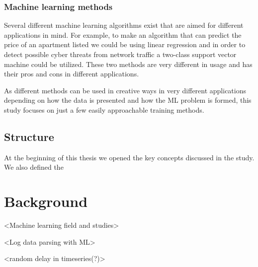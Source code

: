 \documentclass[english, 12pt, a4paper, elec, utf8, a-1b, online]{aaltothesis}
\begin{document}
\subsubsection*{Machine learning methods}
Several different machine learning algorithms exist
that are aimed for different applications in mind.
For example,
to make an algorithm that can predict
the price of an apartment listed\cite{Winky}
we could be using linear regression
and in order to detect
possible cyber threats from network traffic\cite{Ghanem}
a two-class support vector machine could be utilized.
These two methods are very different in usage
and has their pros and cons in different applications.

As different methods can be used in creative ways
in very different applications
depending on how the data is presented
and how the ML problem is formed,
this study focuses on
just a few easily approachable training methods.


\subsection{Structure}\label{subsec:structure}
At the beginning of this thesis
we opened the key concepts discussed in the study.
We also defined the




\clearpage




\section{Background}\label{sec:background}


<Machine learning field and studies>

<Log data parsing with ML>

<random delay in timeseries(?)>
\end{document}
